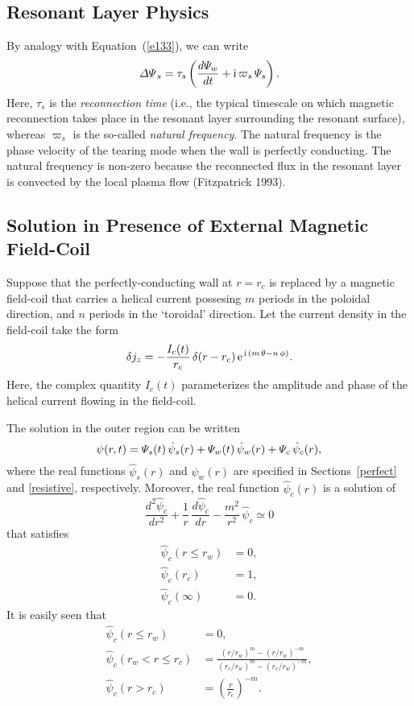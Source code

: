 \documentclass[notitlepage,12pt]{article}
\begin{document}
{\subsection{Resonant Layer Physics}
By analogy with Equation~(\ref{e133}), we can write
\begin{equation}
{\mit\Delta\Psi}_s = \tau_s\left(\frac{d{\mit\Psi}_w}{dt} + {\rm i}\,\varpi_s\,{\mit\Psi}_s\right).
\end{equation}
Here, $\tau_s$ is the {\em reconnection time}\/ (i.e., the typical timescale on which magnetic reconnection takes place in the
resonant layer surrounding the resonant surface), whereas $\varpi_s$ is the so-called {\em natural frequency}. 
The natural frequency is the phase velocity of the tearing mode when the wall is perfectly conducting. The
natural frequency is non-zero because the reconnected flux in the resonant layer is convected by the local plasma
flow (Fitzpatrick 1993). 

\subsection{Solution in Presence of External Magnetic Field-Coil}
Suppose that the perfectly-conducting wall at $r=r_c$ is replaced by a magnetic field-coil that carries a
helical current possesing $m$ periods in the poloidal direction, and $n$ periods in the `toroidal' direction. Let the current density in the field-coil
take the form
\begin{equation}\label{e135}
\delta j_z = -\frac{I_c(t)}{r_c}\,\delta(r-r_c)\,{\rm e}^{\,{\rm i}\,(m\,\theta-n\,\phi)}.
\end{equation}
Here, the complex quantity $I_c(t)$ parameterizes the amplitude and phase of the helical current flowing in the field-coil. 

The solution in the outer region can be written
\begin{equation}
\psi(r,t) = {\mit\Psi}_s(t)\,\hat{\psi}_s(r) + {\mit\Psi}_w(t)\,\hat{\psi}_w(r) + {\mit\Psi}_c\,\hat{\psi}_c(r),
\end{equation}
where the real functions $\hat{\psi}_s(r)$ and $\hat{\psi}_w(r)$ are specified in Sections~\ref{perfect} and \ref{resistive}, respectively. 
Moreover, 
the real function  $\hat{\psi}_c(r)$ is a solution of 
\begin{equation}\label{e100b}
\frac{d^2\hat{\psi}_c}{dr^2} + \frac{1}{r}\,\frac{d\hat{\psi}_c}{dr}-\frac{m^2}{r^2}\,\hat{\psi}_c\simeq 0
\end{equation}
that satisfies
\begin{align}
\hat{\psi}_c(r\leq r_w) &= 0,\\[0.5ex]
\hat{\psi}_c(r_c) &= 1,\\[0.5ex]
\hat{\psi}_c(\infty) &= 0.
\end{align}
It is easily seen that
\begin{align}
\hat{\psi}_c(r\leq r_w) &= 0,\\[0.5ex]
\hat{\psi}_c(r_w<r \leq r_c) &= \frac{(r/r_w)^m-(r/r_w)^{-m}}{(r_c/r_w)^m - (r_c/r_w)^{-m}},\label{e142}\\[0.5ex]
\hat{\psi}_c(r> r_c) &=\left(\frac{r}{r_c}\right)^{-m}.\label{e143}
\end{align}

}
\end{document}
